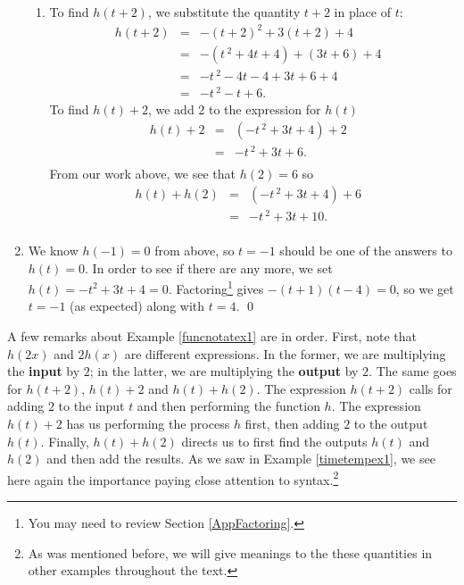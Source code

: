 \documentclass{ximera}
\begin{document}
\begin{example}
\begin{enumerate}
\begin{enumerate}
\item  To find $h(t + 2)$, we substitute the quantity $t + 2$ in place of $t$: \[ \begin{array}{rclr}  
h(t + 2) & = & -(t + 2)^2 + 3(t + 2) + 4 & \\ [2pt]
         & = & -\left(t\,^{2} + 4t + 4\right) + (3t + 6) + 4 & \\ [2pt]
         & = & -t\,^{2} - 4t - 4 + 3t + 6 + 4 &  \\ [2pt]
         & = & -t\,^{2} - t + 6. & 
       \end{array} \] To find $h(t) + 2$, we add $2$ to the expression for $h(t)$ \[ \begin{array}{rclr}  
h(t) + 2 & = & \left(-t\,^{2} + 3t + 4\right) + 2  & \\ [2pt]
         & = & -t\,^{2} + 3t + 6. \\ 
         \end{array} \] From our work above, we see that $h(2) = 6$ so \[ \begin{array}{rclr}  
h(t) + h(2) & = & \left(-t\,^{2} + 3t + 4\right) + 6  & \\ [2pt]
            & = & -t\,^{2} + 3t + 10. \\ 
            \end{array} \]

\end{enumerate}

\item   We know $h(-1) = 0$ from above, so $t=-1$ should be one of the answers to $h(t) = 0$.  In order to see if there are any more, we set  $h(t) = -t^2+3t+4 = 0$. Factoring\footnote{You may need to review Section \ref{AppFactoring}.} gives $-(t+1)(t-4) = 0$, so we get $t=-1$ (as expected) along with $t=4$. \qed   
         
\end{enumerate}
\end{example}

A few remarks about Example \ref{funcnotatex1} are in order.  First, note that $h(2x)$ and $2 h(x)$ are different expressions.  In the former, we are multiplying the \textbf{input} by $2$;  in the latter, we are multiplying the \textbf{output} by $2$.  The same goes for $h(t + 2)$, $h(t) + 2$ and $h(t) + h(2)$.  The expression $h(t + 2)$ calls for adding $2$ to the input $t$ and then performing the function $h$.  The expression $h(t) + 2$ has us performing the process $h$ first, then adding $2$ to the output $h(t)$.  Finally, $h(t) + h(2)$ directs us to first find the outputs $h(t)$ and $h(2)$ and then add the results.  As we saw in Example \ref{timetempex1},  we see here again the importance paying close attention to syntax.\footnote{As was mentioned before, we will give meanings to the these quantities in other examples throughout the text.}
\end{document}
